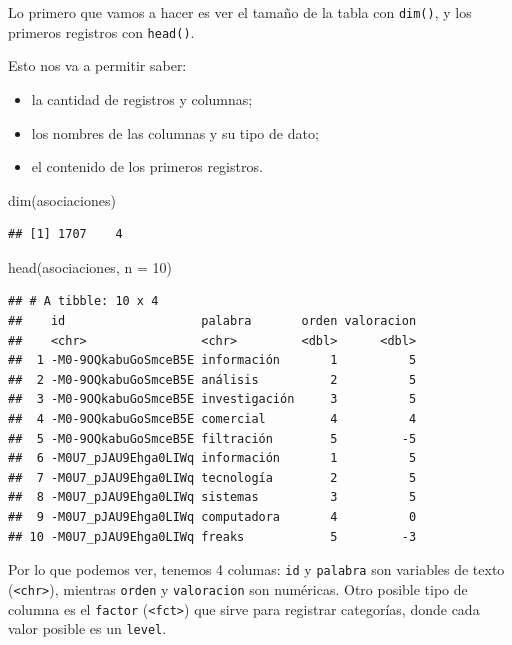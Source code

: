 \documentclass[
]{book}
\newenvironment{Shaded}{\begin{snugshade}}{\end{snugshade}}
\newcommand{\AttributeTok}[1]{\textcolor[rgb]{0.77,0.63,0.00}{#1}}
\newcommand{\DecValTok}[1]{\textcolor[rgb]{0.00,0.00,0.81}{#1}}
\newcommand{\FunctionTok}[1]{\textcolor[rgb]{0.00,0.00,0.00}{#1}}
\newcommand{\NormalTok}[1]{#1}
\providecommand{\tightlist}{%
  \setlength{\itemsep}{0pt}\setlength{\parskip}{0pt}}
\begin{document}
Lo primero que vamos a hacer es ver el tamaño de la tabla con \texttt{dim()}, y los primeros registros con \texttt{head()}.

Esto nos va a permitir saber:

\begin{itemize}
\tightlist
\item
  la cantidad de registros y columnas;
\item
  los nombres de las columnas y su tipo de dato;
\item
  el contenido de los primeros registros.
\end{itemize}

\begin{Shaded}
\begin{Highlighting}[]
\FunctionTok{dim}\NormalTok{(asociaciones)}
\end{Highlighting}
\end{Shaded}

\begin{verbatim}
## [1] 1707    4
\end{verbatim}

\begin{Shaded}
\begin{Highlighting}[]
\FunctionTok{head}\NormalTok{(asociaciones, }\AttributeTok{n =} \DecValTok{10}\NormalTok{) }
\end{Highlighting}
\end{Shaded}

\begin{verbatim}
## # A tibble: 10 x 4
##    id                   palabra       orden valoracion
##    <chr>                <chr>         <dbl>      <dbl>
##  1 -M0-9OQkabuGoSmceB5E información       1          5
##  2 -M0-9OQkabuGoSmceB5E análisis          2          5
##  3 -M0-9OQkabuGoSmceB5E investigación     3          5
##  4 -M0-9OQkabuGoSmceB5E comercial         4          4
##  5 -M0-9OQkabuGoSmceB5E filtración        5         -5
##  6 -M0U7_pJAU9Ehga0LIWq información       1          5
##  7 -M0U7_pJAU9Ehga0LIWq tecnología        2          5
##  8 -M0U7_pJAU9Ehga0LIWq sistemas          3          5
##  9 -M0U7_pJAU9Ehga0LIWq computadora       4          0
## 10 -M0U7_pJAU9Ehga0LIWq freaks            5         -3
\end{verbatim}

Por lo que podemos ver, tenemos 4 columas: \texttt{id} y \texttt{palabra} son variables de texto (\texttt{\textless{}chr\textgreater{}}), mientras \texttt{orden} y \texttt{valoracion} son numéricas. Otro posible tipo de columna es el \texttt{factor} (\texttt{\textless{}fct\textgreater{}}) que sirve para registrar categorías, donde cada valor posible es un \texttt{level}.
\end{document}
